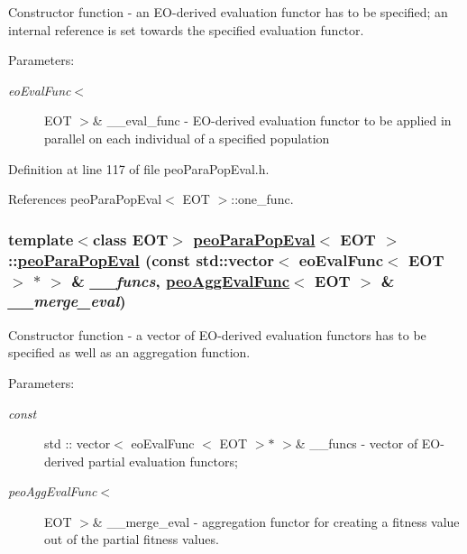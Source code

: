 Constructor function - an EO-derived evaluation functor has to be specified; an internal reference is set towards the specified evaluation functor. 

\begin{Desc}
\item[Parameters:]
\begin{description}
\item[{\em eo\-Eval\-Func$<$}]EOT $>$\& \_\-\_\-eval\_\-func - EO-derived evaluation functor to be applied in parallel on each individual of a specified population \end{description}
\end{Desc}


Definition at line 117 of file peo\-Para\-Pop\-Eval.h.

References peo\-Para\-Pop\-Eval$<$ EOT $>$::one\_\-func.\hypertarget{classpeoParaPopEval_1cc13a1ec366f95d219d682eccb455bc}{
\subsubsection[peoParaPopEval]{\setlength{\rightskip}{0pt plus 5cm}template$<$class EOT$>$ \hyperlink{classpeoParaPopEval}{peo\-Para\-Pop\-Eval}$<$ EOT $>$::\hyperlink{classpeoParaPopEval}{peo\-Para\-Pop\-Eval} (const std::vector$<$ eo\-Eval\-Func$<$ EOT $>$ $\ast$ $>$ \& {\em \_\-\_\-funcs}, \hyperlink{classpeoAggEvalFunc}{peo\-Agg\-Eval\-Func}$<$ EOT $>$ \& {\em \_\-\_\-merge\_\-eval})}}
\label{classpeoParaPopEval_1cc13a1ec366f95d219d682eccb455bc}


Constructor function - a vector of EO-derived evaluation functors has to be specified as well as an aggregation function. 

\begin{Desc}
\item[Parameters:]
\begin{description}
\item[{\em const}]std :: vector$<$ eo\-Eval\-Func $<$ EOT $>$$\ast$ $>$\& \_\-\_\-funcs - vector of EO-derived partial evaluation functors; \item[{\em peo\-Agg\-Eval\-Func$<$}]EOT $>$\& \_\-\_\-merge\_\-eval - aggregation functor for creating a fitness value out of the partial fitness values. \end{description}
\end{Desc}


